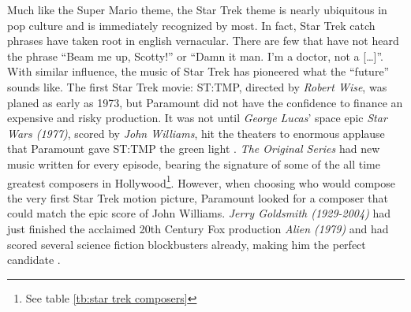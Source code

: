 Much like the Super Mario theme, the Star Trek theme is nearly ubiquitous in pop culture and is immediately recognized by most. In fact, Star Trek catch phrases have taken root in english vernacular. There are few that have not heard the phrase ``Beam me up, Scotty!'' or ``Damn it man. I'm a doctor, not a [\ldots]''. With similar influence, the music of Star Trek has pioneered what the ``future'' sounds like. The first Star Trek movie: \ac{ST:TMP}, directed by \textit{Robert Wise}, was planed as early as 1973, but Paramount did not have the confidence to finance an expensive and risky production. It was not until \textit{George Lucas}' space epic \textit{Star Wars (1977)}, scored by \textit{John Williams}, hit the theaters to enormous applause that Paramount gave \ac{ST:TMP} the green light \parencite{bond_music_1998}. \textit{The Original Series} had new music written for every episode, bearing the signature of some of the all time greatest composers in Hollywood\footnote{See table \ref{tb:star trek composers}}. However, when choosing who would compose the very first Star Trek motion picture, Paramount looked for a composer that could match the epic score of John Williams. \textit{Jerry Goldsmith (1929-2004)} had just finished the acclaimed 20th Century Fox production \textit{Alien (1979)} and had scored several science fiction blockbusters already, making him the perfect candidate \parencite[87]{bond_music_1998}.

